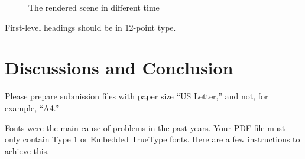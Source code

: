 \documentclass{article}
\begin{document}
\begin{figure}[h]
  \hfill
  \hfill

  \caption{The rendered scene in different time}
  \label{fig:mainfigure}
\end{figure}

First-level headings should be in 12-point type.












\section{Discussions and Conclusion}


Please prepare submission files with paper size ``US Letter,'' and not, for
example, ``A4.''


Fonts were the main cause of problems in the past years. Your PDF file must only
contain Type 1 or Embedded TrueType fonts. Here are a few instructions to
achieve this.
\end{document}
